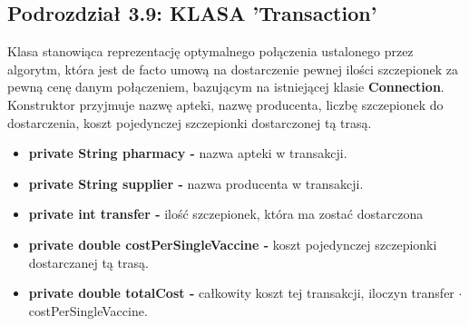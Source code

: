 \documentclass[a4paper]{article}
\begin{document}
\subsection*{Podrozdział 3.9: KLASA 'Transaction'}
\begin{flushleft}
Klasa stanowiąca reprezentację optymalnego połączenia ustalonego przez algorytm, która jest de facto umową na dostarczenie pewnej ilości szczepionek za pewną cenę danym połączeniem, bazującym na istniejącej klasie \textbf{Connection}. Konstruktor przyjmuje nazwę apteki, nazwę producenta, liczbę szczepionek do dostarczenia, koszt pojedynczej szczepionki dostarczonej tą trasą.
\end{flushleft} 
\begin{itemize}
\item \textbf{private String pharmacy -} nazwa apteki w transakcji.
\item \textbf{private String supplier -} nazwa producenta w transakcji.
\item \textbf{private int transfer -} ilość szczepionek, która ma zostać dostarczona
\item \textbf{private double costPerSingleVaccine -} koszt pojedynczej szczepionki dostarczanej tą trasą.
\item \textbf{private double totalCost -} całkowity koszt tej transakcji, iloczyn transfer $\cdot$ costPerSingleVaccine.
\end{itemize}
\end{document}
